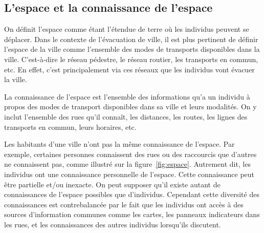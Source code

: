 \documentclass[a4paper]{article}
\begin{document}
\subsection{L'espace et la connaissance de l'espace}

On définit l'espace comme étant l'étendue de terre où les individus peuvent se
déplacer. Dans le contexte de l'évacuation de ville, il est plus pertinent de
définir l'espace de la ville comme l'ensemble des modes de transports
disponibles dans la ville. C'est-à-dire le réseau pédestre, le réseau routier,
les transports en commun, etc. En effet, c'est principalement via ces réseaux
que les individus vont évacuer la ville.

La connaissance de l'espace est l'ensemble des informations qu'a un individu à
propos des modes de transport disponibles dans sa ville et leurs modalités. On y
inclut l'ensemble des rues qu'il connaît, les distances, les routes, les lignes
des transports en commun, leurs horaires, etc.

Les habitants d'une ville n'ont pas la même connaissance de l'espace. Par
exemple, certaines personnes connaissent des rues ou des raccourcis que d'autres
ne connaissent pas, comme illustré sur la figure~\ref{fig:espace}. Autrement
dit, les individus ont une connaissance personnelle de l'espace. Cette
connaissance peut être partielle et/ou inexacte. On peut supposer qu'il existe
autant de connaissances de l'espace possibles que d'individus. Cependant cette
diversité des connaissances est contrebalancée par le fait que les individus ont
accès à des sources d'information communes comme les cartes, les panneaux
indicateurs dans les rues, et les connaissances des autres individus lorsqu'ils
discutent.
\end{document}
